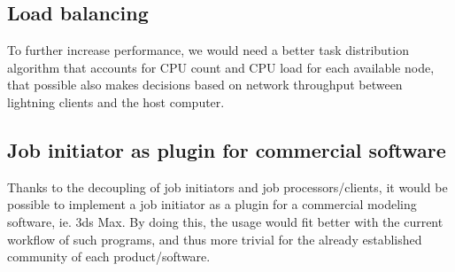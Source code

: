 \subsection{Load balancing}
To further increase performance, we would need a better task distribution algorithm that accounts for CPU count and CPU load for each available node, that possible also makes decisions based on network throughput between lightning clients and the host computer.

\subsection{Job initiator as plugin for commercial software}
Thanks to the decoupling of job initiators and job processors/clients, it would be possible to implement a job initiator as a plugin for a commercial modeling software, ie. 3ds Max. By doing this, the usage would fit better with the current workflow of such programs, and thus more trivial for the already established community of each product/software.

